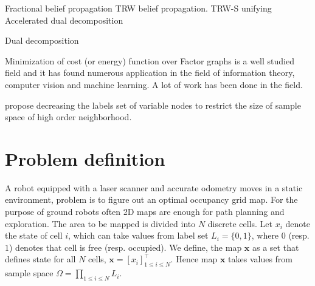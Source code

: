 \documentclass[letterpaper, 10 pt, conference]{ieeeconf} %
\newcommand{\vect}[1]{\mathbf{#1}}
\begin{document}
\cite{wiegerinck2003fractional} Fractional belief propagation
\cite{wainwright2005map} TRW belief propagation.
\cite{kolmogorov2006convergent} TRW-S
\cite{meltzer2009convergent} unifying
\cite{jojic2010accelerated} Accelerated dual decomposition

Dual decomposition 




Minimization of cost (or energy) function over Factor graphs is a well studied
field and it has found numerous application in the field of information theory,
computer vision and machine learning. A lot of work has been done in the field.

\cite{leonardis2006efficient}  propose decreasing the labels set of variable
nodes to restrict the size of sample space of high order neighborhood. 

\section{Problem definition}
\newcommand{\map}{\vect{x}}
\newcommand{\measurements}{\vect{z}}
\newcommand{\poses}{\vect{\rho}}
A robot equipped with a laser scanner and accurate odometry moves in a static
environment, problem is to figure out an optimal occupancy grid map. For the
purpose of ground robots often 2D maps are enough for path planning and
exploration.
The area to be mapped is divided into $N$ discrete cells. Let $x_i$ denote the
state of cell $i$, which can take values from label set $L_i = \{0, 1\}$, where
$0$ (resp. $1$) denotes that cell is free (resp. occupied). We define, the map
$\map$ as a set that defines state for all $N$ cells, $\map = [x_i]^\top_{1
\le i \le N}$. Hence map $\map$ takes values from sample space $\Omega =
\prod_{1 \le i \le N}L_i$.
\end{document}
